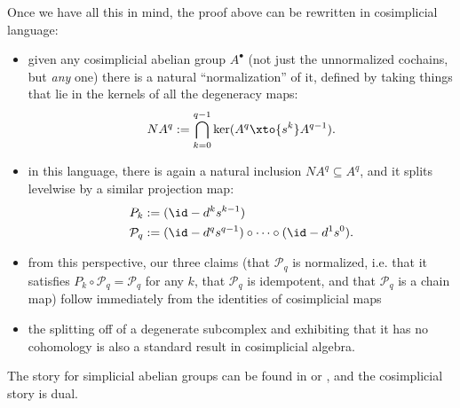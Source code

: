 \documentclass[11pt]{amsart}
\begin{document}
\begin{remark}
Once we have all this in mind, the proof above can be rewritten in cosimplicial language:
\begin{itemize}
    \item given any cosimplicial abelian group $A^\bullet$ (not just the unnormalized cochains, but \emph{any} one) there is a natural ``normalization'' of it, defined by taking things that lie in the kernels of all the degeneracy maps:
    \begin{align*}
        NA^q := \bigcap_{k=0}^{q-1} \ker(A^q \xto{s^k} A^{q-1}).
    \end{align*}
    \item in this language, there is again a natural inclusion $NA^q \subseteq A^q$, and it splits levelwise by a similar projection map:
    \begin{align*}
        P_k &:= (\id - d^k s^{k-1}) \\
        \mathcal{P}_q &:= (\id - d^q s^{q-1}) \circ \cdots \circ (\id - d^1 s^0).
    \end{align*}
    \item from this perspective, our three claims (that $\mathcal{P}_q$ is normalized, i.e. that it satisfies $P_k\circ \mathcal{P}_q = \mathcal{P}_q$ for any $k$, that $\mathcal{P}_q$ is idempotent, and that $\mathcal{P}_q$ is a chain map) follow immediately from the identities of cosimplicial maps
    \item the splitting off of a degenerate subcomplex and exhibiting that it has no cohomology is also a standard result in cosimplicial algebra. 
\end{itemize}
The story for simplicial abelian groups can be found in \cite[VIII.6]{Maclane-homology} or \cite[III.2]{GoerssJardine}, and the cosimplicial story is dual.
\end{remark}






\end{document}
